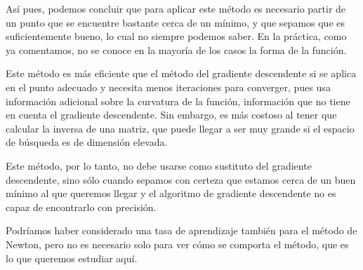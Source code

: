 \documentclass[a4]{article}
\begin{document}
Así pues, podemos concluir que para aplicar este método es necesario partir de un punto que se encuentre bastante cerca de un mínimo, y que sepamos que es suficientemente bueno, lo cual no siempre podemos saber. En la práctica, como ya comentamos, no se conoce en la mayoría de los casos la forma de la función. 

Este método es más eficiente que el método del gradiente descendente si se aplica en el punto adecuado y necesita menos iteraciones para converger, pues usa información adicional sobre la curvatura de la función, información que no tiene en cuenta el gradiente descendente. Sin embargo, es más costoso al tener que calcular la inversa de una matriz, que puede llegar a ser muy grande si el espacio de búsqueda es de dimensión elevada. 

Este método, por lo tanto, no debe usarse como sustituto del gradiente descendente, sino sólo cuando sepamos con certeza que estamos cerca de un buen mínimo al que queremos llegar y el algoritmo de gradiente descendente no es capaz de encontrarlo con precisión. 

Podríamos haber considerado una tasa de aprendizaje también para el método de Newton, pero no es necesario solo para ver cómo se comporta el método, que es lo que queremos estudiar aquí. 
\end{document}
